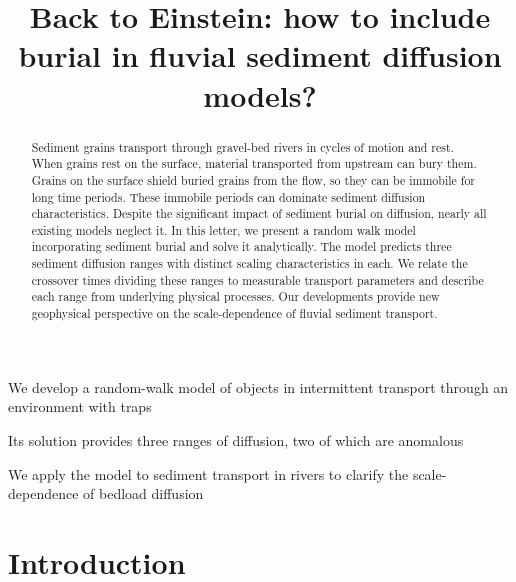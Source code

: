 \documentclass[]{agujournal2018}
\begin{document}
\title{Back to Einstein: how to include burial in fluvial sediment diffusion models?}


\begin{keypoints}
\item We develop a random-walk model of objects in intermittent transport through an environment with traps
\item Its solution provides three ranges of diffusion, two of which are anomalous
\item We apply the model to sediment transport in rivers to clarify the scale-dependence of bedload diffusion

\end{keypoints}

\begin{abstract}
Sediment grains transport through gravel-bed rivers in cycles of motion and rest.
When grains rest on the surface, material transported from upstream can bury them.
Grains on the surface shield buried grains from the flow, so they can be immobile for long time periods.
These immobile periods can dominate sediment diffusion characteristics. 
Despite the significant impact of sediment burial on diffusion, nearly all existing models neglect it.
In this letter, we present a random walk model incorporating sediment burial and solve it analytically.
The model predicts three sediment diffusion ranges with distinct scaling characteristics in each.
We relate the crossover times dividing these ranges to measurable transport parameters and describe each range from underlying physical processes.
Our developments provide new geophysical perspective on the scale-dependence of fluvial sediment transport.
\end{abstract}

\section{Introduction}
\end{document}
